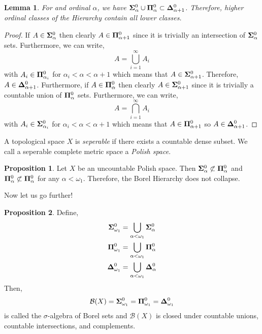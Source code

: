 \documentclass{article}
\newenvironment{definition}[1][Definition:]{\begin{trivlist}
\item[\hskip \labelsep {\bfseries #1}]}{\end{trivlist}}
\theoremstyle{theorem}
\newtheorem{lemma}[theorem]{Lemma}
\theoremstyle{definition}
\theoremstyle{definition}
\newtheorem*{proposition}{Proposition}
\theoremstyle{remark}
\theoremstyle{definition}
\theoremstyle{remark}
\begin{document}
\begin{lemma}
For and ordinal $\alpha$, we have $\mathbf{\Sigma}^0_{\alpha} \cup \mathbf{\Pi}^0_{\alpha} \subset \mathbf{\Delta}^0_{\alpha + 1}$. Therefore, higher ordinal classes of the Hierarchy  contain all lower classes.
\end{lemma}

\begin{proof}
If $A \in \mathbf{\Sigma}^0_{\alpha}$ then clearly $A \in \mathbf{\Pi}^0_{\alpha + 1}$ since it is trivially an intersection of $\mathbf{\Sigma}^0_{\alpha}$ sets. Furthermore, we can write,
\[ A = \bigcup_{i = 1}^{\infty} A_i \]
with $A_i \in \mathbf{\Pi}^0_{\alpha_i}$ for $\alpha_i < \alpha < \alpha + 1$ which means that $A \in \mathbf{\Sigma}^0_{\alpha+1}$. Therefore, $A \in \mathbf{\Delta}^0_{\alpha + 1}$. Furthermore, if $A \in \mathbf{\Pi}^0_{\alpha}$ then clearly $A \in \mathbf{\Sigma}^0_{\alpha + 1}$ since it is trivially a countable union of $\mathbf{\Pi}^0_{\alpha}$ sets. Furthermore, we can write,
\[ A = \bigcap_{i = 1}^{\infty} A_i \]
with $A_i \in \mathbf{\Sigma}^0_{\alpha_i}$ for $\alpha_i < \alpha < \alpha + 1$ which means that $A \in \mathbf{\Pi}^0_{\alpha+1}$ so $A \in \mathbf{\Delta}^0_{\alpha + 1}$.
\end{proof}

\begin{definition}
A topological space $X$ is \textit{seperable} if there exists a countable dense subset. We call a seperable complete metric space a \textit{Polish space}.
\end{definition}

\begin{proposition}
Let $X$ be an uncountable Polish space. Then $\mathbf{\Sigma}^0_{\alpha} \not\subset \mathbf{\Pi}^0_{\alpha}$ and $\mathbf{\Pi}^0_{\alpha} \not \subset \mathbf{\Pi}^0_{\alpha}$ for any $\alpha < \omega_1$. Therefore, the Borel Hierarchy does not collapse. 
\end{proposition}

Now let us go further!
\newcommand{\Borel}[1]{\mathcal{B}(X)}

\begin{proposition}
Define,
\begin{align*}
\mathbf{\Sigma}^0_{\omega_1} & = \bigcup_{\alpha < \omega_1} \mathbf{\Sigma}^0_{\alpha} 
\\
\mathbf{\Pi}^0_{\omega_1} & = \bigcup_{\alpha < \omega_1} \mathbf{\Pi}^0_{\alpha} 
\\
\mathbf{\Delta}^0_{\omega_1} & = \bigcup_{\alpha < \omega_1} \mathbf{\Delta}^0_{\alpha} 
\end{align*}
Then,
\[ \Borel{X} = \BHS{\omega_1} = \BHP{\omega_1} = \BHD{\omega_1} \]
is called the $\sigma$-algebra of Borel sets and $\mathcal{B}(X)$ is closed under countable unions, countable intersections, and complements.
\end{proposition}
\end{document}
